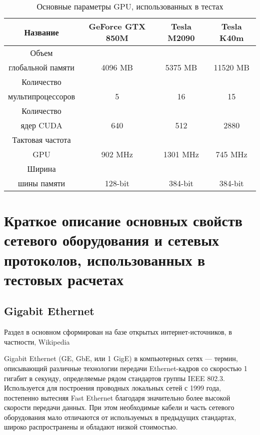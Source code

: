 \begin{table}[ht]
	\begin{center}
		\caption{Основные параметры GPU, использованных в тестах}
		\begin{tabular}{|c|c|c|c|}
			\hline
			Название                &  GeForce GTX 850M & Tesla M2090 & Tesla K40m \\ \hline
			Объем                  &                   &             &             \\
			глобальной памяти       & 4096 MB           & 5375 MB     & 11520 MB \\ \hline
			Количество              &             &               &     \\
			мультипроцессоров       & 5           &  16           & 15  \\ \hline
			Количество              &             &               &     \\
			ядер CUDA               & 640         & 512         & 2880  \\ \hline
			Тактовая частота        &             &             &         \\
			GPU                     & 902 MHz     & 1301 MHz    & 745 MHz \\ \hline
			Ширина                  &             &             &         \\
			шины памяти             & 128-bit     & 384-bit     & 384-bit \\ \hline
		\end{tabular}
		\label{GPUs}
	\end{center}
\end{table}



\chapter{Краткое описание основных свойств сетевого оборудования и сетевых протоколов, использованных в тестовых расчетах} \label{AppendixB}

\section{Gigabit Ethernet}
Раздел в основном сформирован на базе открытых интернет-источников, в частности, Wikipedia 

Gigabit Ethernet (GE, GbE, или 1 GigE) в компьютерных сетях — термин, описывающий различные технологии передачи Ethernet-кадров со скоростью 1 гигабит в секунду, определяемые рядом стандартов группы IEEE 802.3. Используется для построения проводных локальных сетей с 1999 года, постепенно вытесняя Fast Ethernet благодаря значительно более высокой скорости передачи данных. При этом необходимые кабели и часть сетевого оборудования мало отличаются от используемых в предыдущих стандартах, широко распространены и обладают низкой стоимостью.

